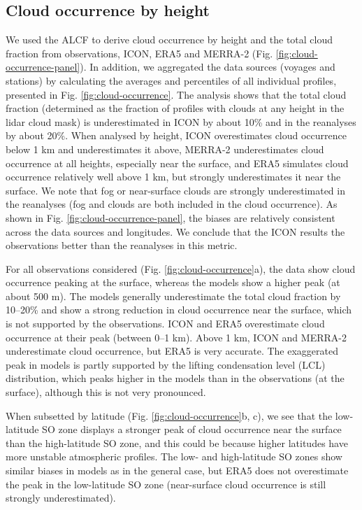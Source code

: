 \documentclass[12pt,a4paper]{article}
\begin{document}
\subsection{Cloud occurrence by height}
\label{sec:cloud-occurrence}

We used the ALCF to derive cloud occurrence by height and the total cloud
fraction from observations, ICON, ERA5 and MERRA-2 (Fig.
\ref{fig:cloud-occurrence-panel}). In addition, we aggregated the data sources
(voyages and stations) by calculating the averages and percentiles of all
individual profiles, presented in Fig. \ref{fig:cloud-occurrence}. The analysis
shows that the total cloud fraction (determined as the fraction of profiles
with clouds at any height in the lidar cloud mask) is underestimated in ICON
by about 10\% and in the reanalyses by about 20\%. When analysed by
height, ICON overestimates cloud occurrence below 1 km and underestimates it
above, MERRA-2 underestimates cloud occurrence at all heights, especially near
the surface, and ERA5 simulates cloud occurrence relatively well above 1 km,
but strongly underestimates it near the surface.  We note that fog or
near-surface clouds are strongly underestimated in the reanalyses (fog and clouds are
both included in the cloud occurrence).  As shown in Fig.
\ref{fig:cloud-occurrence-panel}, the biases are relatively consistent across
the data sources and longitudes. We conclude that the ICON results  the observations better than the reanalyses in this metric.

For all observations considered (Fig. \ref{fig:cloud-occurrence}a), the data show
cloud occurrence peaking at the surface, whereas the models show a higher peak (at
about 500 m). The models generally underestimate the total cloud fraction by 10--20\% and show a strong reduction in cloud occurrence near the surface, which is not
supported by the observations. ICON and ERA5 overestimate cloud occurrence at
their peak (between 0--1 km). Above 1 km, ICON and MERRA-2 underestimate cloud
occurrence, but ERA5 is very accurate. The exaggerated peak in models is partly
supported by the lifting condensation level (LCL) distribution, which peaks
higher in the models than in the observations (at the surface), although this
is not very pronounced.

When subsetted by latitude (Fig.
\ref{fig:cloud-occurrence}b, c), we see that the low-latitude SO zone displays
a stronger peak of cloud occurrence near the surface than the high-latitude SO
zone, and this could be because higher latitudes have more unstable atmospheric
profiles. The low- and high-latitude SO zones show similar biases in models as
in the general case, but ERA5 does not overestimate the peak in the
low-latitude SO zone (near-surface cloud occurrence is still strongly
underestimated).
\end{document}
